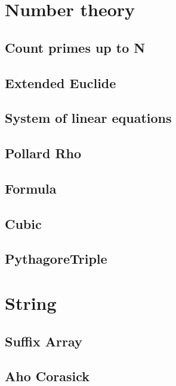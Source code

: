 \section{Number theory}
\subsection{Count primes up to N}
\raggedbottom
\hrulefill
\subsection{Extended Euclide}
\raggedbottom
\hrulefill
\subsection{System of linear equations}
\raggedbottom
\hrulefill
\subsection{Pollard Rho}
\raggedbottom
\hrulefill
\subsection{Formula}
\raggedbottom
\hrulefill
\subsection{Cubic}
\raggedbottom
\hrulefill
\subsection{PythagoreTriple}
\raggedbottom
\hrulefill

\section{String}
\subsection{Suffix Array}
\raggedbottom
\hrulefill
\subsection{Aho Corasick}
\raggedbottom
\hrulefill
